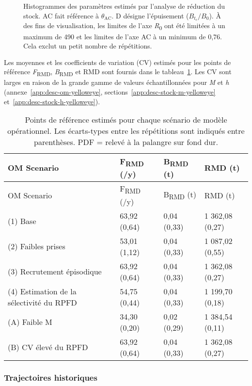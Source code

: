 \documentclass[french,11pt]{book}
\begin{document}
\begin{figure}[htb]

{\centering {} 

}

\caption{Histogrammes des paramètres estimés par l'analyse de réduction du stock. AC fait référence à \(\theta_\textrm{AC}\). D désigne l'épuisement (\(B_{t_c}/B_0\)). À des fins de visualisation, les limites de l'axe \emph{R}\textsubscript{0} ont été limitées à un maximum de 490 et les limites de l'axe AC à un minimum de 0,76. Cela exclut un petit nombre de répétitions.}\label{fig:sra-conditioned-parameters}
\end{figure}
Les moyennes et les coefficients de variation (CV) estimés pour les points de référence \emph{F}\textsubscript{RMD}, \emph{B}\textsubscript{RMD} et RMD sont fournis dans le tableau~\ref{tab:sra-ref-pts}. Les CV sont larges en raison de la grande gamme de valeurs échantillonnées pour \emph{M} et \emph{h} (annexe~\ref{app:desc-om-yelloweye}, sections~\ref{app:desc-stock-m-yelloweye} et~\ref{app:desc-stock-h-yelloweye}).
\begin{longtable}[]{@{}llll@{}}
\caption{\label{tab:sra-ref-pts}Points de référence estimés pour chaque scénario de modèle opérationnel. Les écarts-types entre les répétitions sont indiqués entre parenthèses. PDF = relevé à la palangre sur fond dur.}\tabularnewline
\toprule
OM Scenario & F\textsubscript{RMD} (/y) & B\textsubscript{RMD} (t) & RMD (t)\tabularnewline
\midrule
\endfirsthead
\toprule
OM Scenario & F\textsubscript{RMD} (/y) & B\textsubscript{RMD} (t) & RMD (t)\tabularnewline
\midrule
\endhead
(1) Base & 63,92 (0,64) & 0,04 (0,33) & 1 362,08 (0,27)\tabularnewline
(2) Faibles prises & 53,01 (1,12) & 0,04 (0,33) & 1 087,02 (0,55)\tabularnewline
(3) Recrutement épisodique & 63,92 (0,64) & 0,04 (0,33) & 1 362,08 (0,27)\tabularnewline
(4) Estimation de la sélectivité du RPFD & 54,75 (0,44) & 0,04 (0,33) & 1 199,70 (0,18)\tabularnewline
(A) Faible M & 34,30 (0,20) & 0,02 (0,29) & 1 384,54 (0,11)\tabularnewline
(B) CV élevé du RPFD & 63,92 (0,64) & 0,04 (0,33) & 1 362,08 (0,27)\tabularnewline
\bottomrule
\end{longtable}
\clearpage

\hypertarget{sec:approach3-conditioning-trajectories}{%
\subsubsection{Trajectoires historiques}\label{sec:approach3-conditioning-trajectories}}
\end{document}
